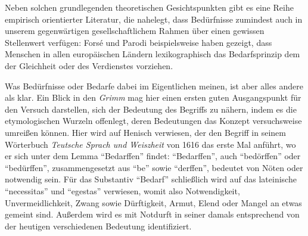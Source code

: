 \documentclass[a4paper]{thesis}
\begin{document}
Neben solchen grundlegenden theoretischen Gesichtspunkten gibt es eine Reihe empirisch orientierter Literatur, die nahelegt, dass Bedürfnisse zumindest auch in unserem gegenwärtigen gesellschaftlichem Rahmen über einen gewissen Stellenwert verfügen: Forsé und Parodi beispielsweise haben gezeigt, dass Menschen in allen europäischen Ländern lexikographisch das Bedarfsprinzip dem der Gleichheit oder des Verdienstes vorziehen.

Was Bedürfnisse oder Bedarfe dabei im Eigentlichen meinen, ist aber alles andere als klar. Ein Blick in den \textit{Grimm} mag hier einen ersten guten Ausgangspunkt für den Versuch darstellen, sich der Bedeutung des Begriffs zu nähern, indem es die etymologischen Wurzeln offenlegt, deren Bedeutungen das Konzept versuchsweise umreißen können. Hier wird auf Henisch verwiesen, der den Begriff in seinem Wörterbuch \textit{Teutsche Sprach und Weiszheit} von 1616 das erste Mal anführt, wo er sich unter dem Lemma \enquote{Bedarffen} findet: \enquote{Bedarffen}, auch \enquote{bedörffen} oder \enquote{bedürffen}, zusammengesetzt aus \enquote{be} sowie \enquote{derffen}, bedeutet von Nöten oder notwendig sein. Für das Substantiv \enquote{Bedarf} schließlich wird auf das lateinische \enquote{necessitas} und \enquote{egestas} verwiesen, womit also Notwendigkeit, Unvermeidlichkeit, Zwang sowie Dürftigkeit, Armut, Elend oder Mangel an etwas gemeint sind. Außerdem wird es mit Notdurft in seiner damals entsprechend von der heutigen verschiedenen Bedeutung identifiziert.
\end{document}
